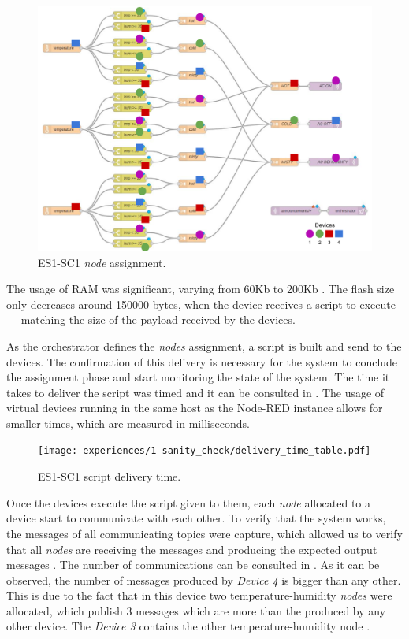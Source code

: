 \begin{figure}[h]
\centering
\includegraphics[width=\linewidth]{thesis/figures/experiences/1-sanity_check/node-assignment-visual.pdf}
\caption[ES1-SC1 \textit{node} assignment.]{ES1-SC1 \textit{node} assignment.}\label{fig:sanity_check_node_assignment_visual}
\end{figure}

The usage of RAM was significant, varying from 60Kb to 200Kb . The flash size only decreases around 150000 bytes, when the device receives a script to execute --- matching the size of the payload received by the devices.

As the orchestrator defines the \textit{nodes} assignment, a script is built and send to the devices. The confirmation of this delivery is necessary for the system to conclude the assignment phase and start monitoring the state of the system.  The time it takes to deliver the script was timed and it can be consulted in . The usage of virtual devices running in the same host as the Node-RED instance allows for smaller times, which are measured in milliseconds.

\begin{figure}[h]
\centering
\texttt{[image: experiences/1-sanity\_check/delivery\_time\_table.pdf]}
\caption[ES1-SC1 script delivery time.]{ES1-SC1 script delivery time.}\label{fig:sanity_check_delivery_time}
\end{figure}

Once the devices execute the script given to them, each \textit{node} allocated to a device start to communicate with each other. To verify that the system works, the messages of all communicating topics were capture, which allowed us to verify that all \textit{nodes} are receiving the messages and producing the expected output messages . The number of communications can be consulted in . As it can be observed, the number of messages produced by \textit{Device 4} is bigger than any other. This is due to the fact that in this device two temperature-humidity \textit{nodes} were allocated, which publish 3 messages which are more than the produced by any other device. The \textit{Device 3} contains the other temperature-humidity node .


